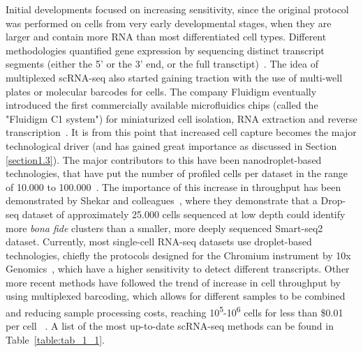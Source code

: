 Initial developments focused on increasing sensitivity, since the original protocol was performed on cells from very early developmental stages, when they are larger and contain more RNA than most differentiated cell types. Different methodologies quantified gene expression by sequencing distinct transcript segments (either the 5' or the 3' end, or the full transctipt)~\citep{islam_characterization_2011,hashimshony_cel-seq:_2012,ramskold_full-length_2012,picelli_full-length_2014}. The idea of multiplexed scRNA-seq also started gaining traction with the use of multi-well plates or molecular barcodes for cells. The company Fluidigm eventually introduced the first commercially available microfluidics chips (called the "Fluidigm C1 system") for miniaturized cell isolation, RNA extraction and reverse transcription~\citep{brennecke_accounting_2013}. It is from this point that increased cell capture becomes the major technological driver (and has gained great importance as discussed in Section \ref{section1.3}). The major contributors to this have been nanodroplet-based technologies, that have put the number of profiled cells per dataset in the range of 10.000 to 100.000~\citep{macosko_highly_2015,klein_droplet_2015}. The importance of this increase in throughput has been demonstrated by Shekar and colleagues~\citep{shekhar_comprehensive_2016}, where they demonstrate that a Drop-seq dataset of approximately 25.000 cells sequenced at low depth could identify more \textit{bona fide} clusters than a smaller, more deeply sequenced Smart-seq2 dataset. Currently, most single-cell RNA-seq datasets use droplet-based technologies, chiefly the protocols designed for the Chromium instrument by 10x Genomics~\citep{zheng_massively_2017}, which have a higher sensitivity to detect different transcripts. Other more recent methods have followed the trend of increase in cell throughput by using multiplexed barcoding, which allows for different samples to be combined and reducing sample processing costs, reaching 10\textsuperscript{5}-10\textsuperscript{6} cells for less than \$0.01 per cell ~\citep{rosenberg_single-cell_2018,cao_single-cell_2019}. A list of the most up-to-date scRNA-seq methods can be found in Table~\ref{table:tab_1_1}.

